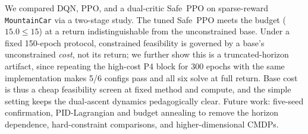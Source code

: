 \documentclass{article}
\begin{document}
We compared DQN, PPO, and a dual-critic Safe~PPO on sparse-reward \texttt{MountainCar} via a
two-stage study. The tuned Safe~PPO meets the budget ($15.0 \le 15$) at a return indistinguishable
from the unconstrained base. Under a fixed 150-epoch protocol, constrained feasibility is governed
by a base's unconstrained \emph{cost}, not its return; we further show this is a truncated-horizon
artifact, since repeating the high-cost P4 block for 300 epochs with the same implementation makes
5/6 configs pass and all six solve at full return. Base cost is thus a cheap feasibility screen at
fixed method and compute, and the simple setting keeps the dual-ascent dynamics pedagogically clear.
Future work: five-seed confirmation, PID-Lagrangian and budget annealing to remove the horizon
dependence, hard-constraint comparisons, and higher-dimensional CMDPs.

\vspace{-6pt}
{\scriptsize
\setlength{\bibsep}{0pt}


}
\end{document}
